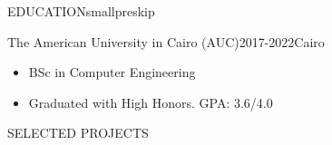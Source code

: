 \documentclass{resume}
\begin{document}
\begin{minipage}[t]{0.54\textwidth}

	\begin{rsection}{\MakeUppercase{education}}{smallpreskip}

		\begin{rcontent}{The American University in Cairo (AUC)}{2017-2022}{}{Cairo}
			\begin{itemize}
				\item BSc in Computer Engineering
				\item Graduated with High Honors. GPA: 3.6/4.0
			\end{itemize}
		\end{rcontent}

	\end{rsection}

	\begin{rsection}{\MakeUppercase{selected projects}}{}


\end{rsection}
\end{minipage}
\end{document}

